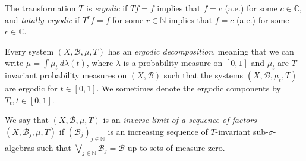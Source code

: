 \documentclass[11pt]{amsart}
\newcommand{\cB}{\mathcal{B}}
\newcommand{\N}{\mathbb{N}}
\theoremstyle{plain}
\theoremstyle{definition}
\theoremstyle{remark}
\begin{document}

The transformation $T$ is {\it ergodic} if $Tf=f$ implies that $f=c$
(a.e.) for some $c\in \mathbb{C}$, and \emph{totally ergodic} if
$T^rf=f$ for some $r\in\N$ implies that $f=c$ (a.e.) for some $c\in
\mathbb{C}$.

Every system $(X,\cB,\mu,T)$ has an {\it ergodic decomposition},
meaning that we can write $\mu=\int \mu_t\ d\lambda(t)$, where
$\lambda$ is a probability measure on $[0,1]$ and $\mu_t$ are
$T$-invariant probability measures on $(X,\cB)$ such that the systems
$(X,\cB,\mu_t,T)$ are ergodic for $t\in [0,1]$. We sometimes denote
the ergodic components by $T_t, t\in [0,1]$.

We say that $(X,\cB,\mu,T)$ is an {\it inverse limit of a sequence of
  factors} $(X,\cB_j,\mu,T)$ if $(\cB_j)_{j\in\mathbb{N}}$ is an
increasing sequence of $T$-invariant sub-$\sigma$-algebras such that
$\bigvee_{j\in\N}\mathcal{B}_j=\mathcal{B}$ up to sets of measure
zero.
\end{document}
